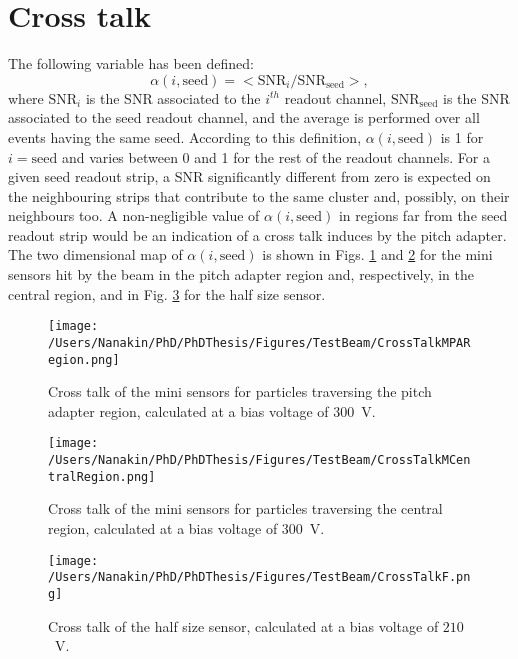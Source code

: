 \section{Cross talk}
\label{sec:CrossTalk}

The following variable has been defined:
\begin{displaymath}
\alpha(i,\mathrm{seed}) = < \mathrm{SNR}_i/\mathrm{SNR}_\mathrm{seed} >,
\end{displaymath}
where $\mathrm{SNR}_i$ is the SNR associated to the $i^{th}$ readout channel, $\mathrm{SNR}_\mathrm{seed}$ is the SNR associated to the seed readout channel, and the average is performed over all events having the same seed.
According to this definition, $\alpha(i,\mathrm{seed})$ is 1 for $i = \mathrm{seed}$ and varies between 0 and 1 for the rest of the readout channels. 
For a given seed readout strip, a SNR significantly different from zero is expected on the neighbouring strips that contribute to the same cluster and, possibly, on their neighbours too. A non-negligible value of $\alpha(i,\mathrm{seed})$ in regions far from the seed readout strip would be an indication of a cross talk induces by the pitch adapter.
The two dimensional map of $\alpha(i,\mathrm{seed})$ is shown in Figs. \ref{fig:CrossTalkMPARegion} and \ref{fig:CrossTalkMCentralRegion} for the mini sensors hit by the beam in the pitch adapter region and, respectively, in the central region, and in Fig. \ref{fig:CrossTalkF} for the half size sensor.

\begin{figure}[]
\centering
\texttt{[image: /Users/Nanakin/PhD/PhDThesis/Figures/TestBeam/CrossTalkMPARegion.png]}
\caption[Cross talk of the mini sensors for particles traversing the pitch adapter region.]{Cross talk of the mini sensors for particles traversing the pitch adapter region, calculated at a bias voltage of $300$~V.}
\label{fig:CrossTalkMPARegion}
\end{figure}

\begin{figure}[]
\centering
\texttt{[image: /Users/Nanakin/PhD/PhDThesis/Figures/TestBeam/CrossTalkMCentralRegion.png]}
\caption[Cross talk of the mini sensors for particles traversing the central region.]{Cross talk of the mini sensors for particles traversing the central region, calculated at a bias voltage of $300$~V.}
\label{fig:CrossTalkMCentralRegion}
\end{figure}

\begin{figure}[]
\centering
\texttt{[image: /Users/Nanakin/PhD/PhDThesis/Figures/TestBeam/CrossTalkF.png]}
\caption[Cross talk of the half size sensor.]{Cross talk of the half size sensor, calculated at a bias voltage of $210$~V.}
\label{fig:CrossTalkF}
\end{figure}